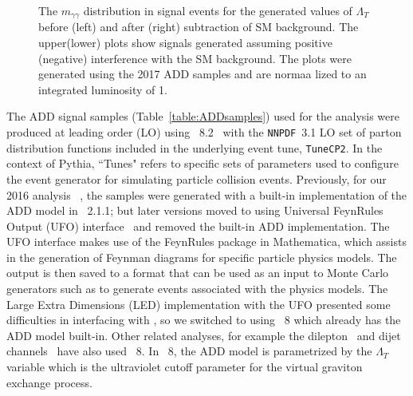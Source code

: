 \begin{figure}[tbp!]
\begin{center}
\end{center}
\caption{The $m_{\gamma\gamma}$ distribution in signal events for the generated values of $\Lambda_T$ before (left) and after (right) subtraction of SM background. The upper(lower) plots show signals generated assuming positive (negative) interference with the SM background. The plots were generated using the 2017 ADD samples and are normaa
lized to an integrated luminosity of 1\fbinv.
}
\label{fig:ADDsignal}
\end{figure}

The ADD signal samples (Table~\ref{table:ADDsamples}) used for the analysis were produced at leading order (LO) using \PYTHIA~8.2~\cite{Sjostrand:2008za} with the \texttt{NNPDF}~3.1 LO set of parton distribution functions included in the underlying event tune, \texttt{TuneCP2}. In the context of Pythia, ``Tunes" refers to specific sets of parameters used to configure the event generator for simulating particle collision events. Previously, for our 2016 analysis~\cite{Sirunyan:2018wnk} , the samples were generated with a built-in implementation of the ADD model in \SHERPA~2.1.1;  but later \SHERPA versions moved to using Universal FeynRules Output (UFO) interface~\cite{Degrande:2011ua} and removed the built-in ADD implementation. The UFO interface makes use of the FeynRules package in Mathematica, which assists in the generation of Feynman diagrams for specific particle physics models. The output is then saved to a format that can be used as an input to Monte Carlo generators such as \SHERPA to generate events associated with the physics models. The Large Extra Dimensions (LED) implementation with the UFO presented some difficulties in interfacing with \SHERPA, so we switched to using \PYTHIA~8 which already has the ADD model built-in. Other related analyses, for example the dilepton~\cite{CMS:2021ctt, Sirunyan:2019} and dijet channels~\cite{CMS:2017caz} have also used \PYTHIA~8. In \PYTHIA~8, the ADD model is parametrized by the $\Lambda_T$ variable which is the ultraviolet cutoff parameter for the virtual graviton exchange process.



